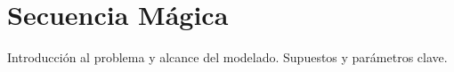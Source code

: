 
\section{Secuencia Mágica}\label{sec:03-secuencia-magica}
Introducción al problema y alcance del modelado.
Supuestos y parámetros clave.
